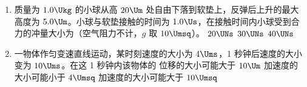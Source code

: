 \documentclass[\gkver]{gaokaozhenti}
\begin{document}
\begin{enumerate}
{初始时点光源到透镜的距离大于 $f$ 小于 $2f$，若将此透镜沿 $x$ 轴向右平移 $2f$ 的距离，点光源一直在凸透镜的一倍焦距以外，成倒立的实像。①凸透镜成实像时，点光源在二倍焦距处，物像之间的距离最小；②物体在凸透镜的一倍焦距和二倍焦距之间，在凸透镜的二倍焦距以外成倒立放大的实像；③凸透镜向右移动，凸透镜移动距离物体二倍焦距处，在凸透镜的二倍焦距处得到倒立等大的实像；④凸透镜继续向右移动，凸透镜距离物体在二倍焦距以外，在凸透镜的一倍焦距和二倍焦距之间成倒立缩小的实像；故成像先向左移动，然后再向右移动，故 C 正确。
}

\item
质量为 $1.0\Ukg$ 的小球从高 $20\Um$ 处自由下落到软垫上，反弹后上升的最大高度为 $5.0\Um$。小球与软垫接触的时间为 $1.0\Us$，在接触时间内小球受到合力的冲量大小为（空气阻力不计，$g$ 取 $10\Umsq$）。
\fourchoices[answer=C]
{$10\UNs$}
{$20\UNs$}
{$30\UNs$}
{$40\UNs$}

\item
一物体作匀变速直线运动，某时刻速度的大小为 $4\Ums$，1 秒钟后速度的大小变为 $10\Ums$。在这 1 秒钟内该物体的
{位移的大小可能大于 $10\Um$}
{加速度的大小可能小于 $4\Umsq$}
{加速度的大小可能大于 $10\Umsq$}


\end{enumerate}
\end{document}
